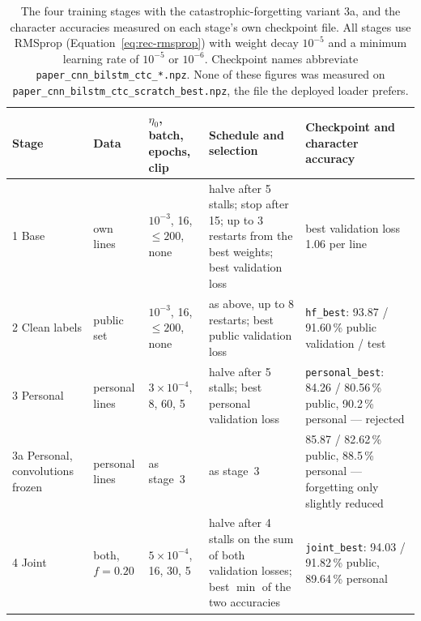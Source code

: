 \begin{table}[h]
\centering
\fontsize{8.5}{10.2}\selectfont
\setlength{\tabcolsep}{4pt}
\begin{tabularx}{\linewidth}{|p{1.8cm}|p{1.4cm}|p{2.0cm}|X|p{3.2cm}|}
\hline
\textbf{Stage} & \textbf{Data} & \textbf{$\eta_0$, batch, epochs, clip} & \textbf{Schedule and selection} & \textbf{Checkpoint and character accuracy} \\
\hline
1 Base & own lines & $10^{-3}$, 16, $\le200$, none & halve after 5 stalls; stop after 15; up to 3 restarts from the best weights; best validation loss & best validation loss 1.06 per line \\
\hline
2 Clean labels & public set & $10^{-3}$, 16, $\le200$, none & as above, up to 8 restarts; best public validation loss & \texttt{hf\_best}: 93.87 / 91.60\,\% public validation / test \\
\hline
3 Personal & personal lines & $3\!\times\!10^{-4}$, 8, 60, 5 & halve after 5 stalls; best personal validation loss & \texttt{personal\_best}: 84.26 / 80.56\,\% public, 90.2\,\% personal --- rejected \\
\hline
3a Personal, convolutions frozen & personal lines & as stage~3 & as stage~3 & 85.87 / 82.62\,\% public, 88.5\,\% personal --- forgetting only slightly reduced \\
\hline
4 Joint & both, $f=0.20$ & $5\!\times\!10^{-4}$, 16, 30, 5 & halve after 4 stalls on the sum of both validation losses; best $\min$ of the two accuracies & \texttt{joint\_best}: 94.03 / 91.82\,\% public, 89.64\,\% personal \\
\hline
\end{tabularx}
\caption{The four training stages with the catastrophic-forgetting variant 3a, and the character accuracies measured on each stage's own checkpoint file. All stages use RMSprop (Equation~\ref{eq:rec-rmsprop}) with weight decay $10^{-5}$ and a minimum learning rate of $10^{-5}$ or $10^{-6}$. Checkpoint names abbreviate \texttt{paper\_cnn\_bilstm\_ctc\_*.npz}. None of these figures was measured on \texttt{paper\_cnn\_bilstm\_ctc\_scratch\_best.npz}, the file the deployed loader prefers.}
\label{tab:rec-stages}
\end{table}

